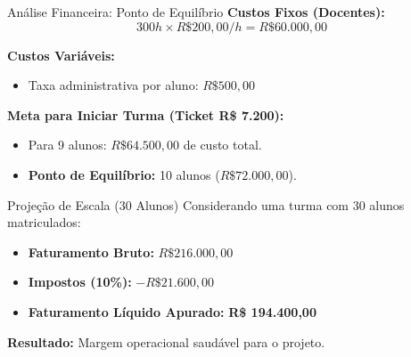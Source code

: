 \documentclass[10pt]{beamer}
\begin{document}
\begin{frame}{Análise Financeira: Ponto de Equilíbrio}
    \textbf{Custos Fixos (Docentes):}
    \begin{equation*}
        300h \times R\$ 200,00/h = R\$ 60.000,00
    \end{equation*}

    \textbf{Custos Variáveis:}
    \begin{itemize}
        \item Taxa administrativa por aluno: $R\$ 500,00$
    \end{itemize}

    \textbf{Meta para Iniciar Turma (Ticket R\$ 7.200):}
    \begin{itemize}
        \item Para 9 alunos: $R\$ 64.500,00$ de custo total.
        \item \textbf{Ponto de Equilíbrio:} 10 alunos ($R\$ 72.000,00$).
    \end{itemize}
\end{frame}

\begin{frame}{Projeção de Escala (30 Alunos)}
    Considerando uma turma com 30 alunos matriculados:

    \begin{itemize}
        \item \textbf{Faturamento Bruto:} $R\$ 216.000,00$
        \item \textbf{Impostos (10\%):} $- R\$ 21.600,00$
        \item \textbf{Faturamento Líquido Apurado:} \textbf{R\$ 194.400,00}
    \end{itemize}

    \vfill
    \begin{center}
        \textbf{Resultado:} Margem operacional saudável para o projeto.
    \end{center}
\end{frame}
\end{document}
